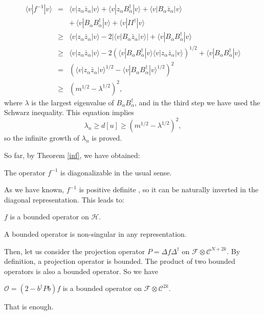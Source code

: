 \documentclass[a4paper,a4paper]{article}
\begin{document}
\begin{eqnarray}
\langle v|f^{-1}|v\rangle &=&\langle
v|z_\alpha\bar{z}_\alpha|v\rangle+\langle v|z_\alpha
B_\alpha^\dag|v\rangle+\langle v|B_\alpha\bar{z}_\alpha|v\rangle \nonumber\\
&&+\,\langle v|B_\alpha B_\alpha^\dag|v\rangle+\langle
v|II^\dag|v\rangle \nonumber\\
&\geq &\langle v|z_\alpha\bar{z}_\alpha|v\rangle-2|\langle
v|B_\alpha\bar{z}_\alpha|v\rangle|+\langle v|B_\alpha
B_\alpha^\dag|v\rangle \nonumber\\
&\geq &\langle v|z_\alpha\bar{z}_\alpha|v\rangle-2(\langle
v|B_\alpha B_\alpha^\dag|v\rangle\langle
v|z_\alpha\bar{z}_\alpha|v\rangle)^{1/2}+\langle v|B_\alpha
B_\alpha^\dag|v\rangle \nonumber\\
&=&(\langle v|z_\alpha\bar{z}_\alpha|v\rangle^{1/2}-\langle
v|B_\alpha B_\alpha^\dag|v\rangle^{1/2})^2 \nonumber\\
&\geq &(m^{1/2}-\lambda^{1/2})^2,
\end{eqnarray}
where $\lambda$ is the largest eigenvalue of $B_\alpha
B_\alpha^\dag$, and in the third step we have used the Schwarz
inequality. This equation implies
\begin{equation}
\lambda_n\geq d[u]\geq(m^{1/2}-\lambda^{1/2})^2,
\end{equation}
so the infinite growth of $\lambda_n$ is proved.

So far, by Theorem \ref{inf}, we have obtained:
\begin{propo}
The operator $f^{-1}$ is diagonalizable in the usual sense.
\end{propo}
As we have known, $f^{-1}$ is positive definite \cite{Reviewa}, so
it can be naturally inverted in the diagonal representation. This
leads to:
\begin{propo}
$f$ is a bounded operator on $\mathcal{H}$.
\end{propo}
A bounded operator is non-singular in any representation.

Then, let us consider the projection operator $P=\Delta
f\Delta^\dag$ on $\mathcal{F}\otimes\mathcal{C}^{N+2k}$. By
definition, a projection operator is bounded. The product of two
bounded operators is also a bounded operator. So we have
\begin{propo}
$\mathcal{O}=(2-b^\dag P b)f$ is a bounded operator on
$\mathcal{F}\otimes\mathcal{C}^{2k}$.
\end{propo}
That is enough.
\end{document}

